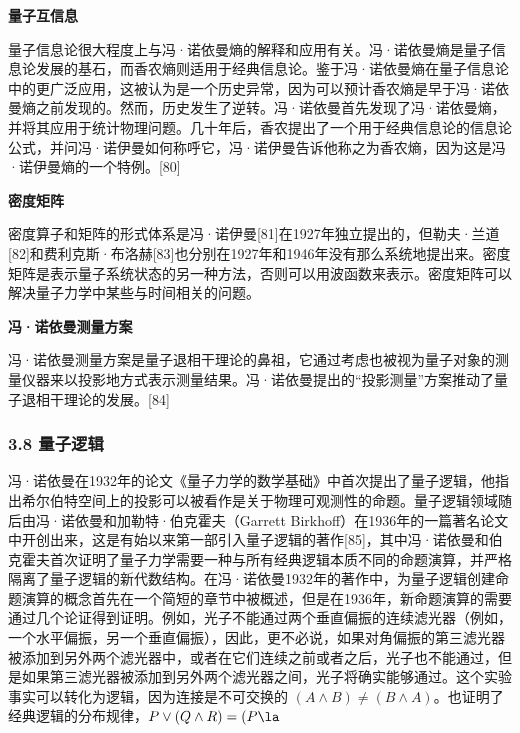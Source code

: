 \textbf{量子互信息}

量子信息论很大程度上与冯·诺依曼熵的解释和应用有关。冯·诺依曼熵是量子信息论发展的基石，而香农熵则适用于经典信息论。鉴于冯·诺依曼熵在量子信息论中的更广泛应用，这被认为是一个历史异常，因为可以预计香农熵是早于冯·诺依曼熵之前发现的。然而，历史发生了逆转。冯·诺依曼首先发现了冯·诺依曼熵，并将其应用于统计物理问题。几十年后，香农提出了一个用于经典信息论的信息论公式，并问冯·诺伊曼如何称呼它，冯·诺伊曼告诉他称之为香农熵，因为这是冯·诺伊曼熵的一个特例。[80]

\textbf{密度矩阵}

密度算子和矩阵的形式体系是冯·诺伊曼[81]在1927年独立提出的，但勒夫·兰道[82]和费利克斯·布洛赫[83]也分别在1927年和1946年没有那么系统地提出来。密度矩阵是表示量子系统状态的另一种方法，否则可以用波函数来表示。密度矩阵可以解决量子力学中某些与时间相关的问题。

\textbf{冯·诺依曼测量方案}

冯·诺依曼测量方案是量子退相干理论的鼻祖，它通过考虑也被视为量子对象的测量仪器来以投影地方式表示测量结果。冯·诺依曼提出的“投影测量”方案推动了量子退相干理论的发展。[84]
\subsubsection{3.8 量子逻辑}
冯·诺依曼在1932年的论文《量子力学的数学基础》中首次提出了量子逻辑，他指出希尔伯特空间上的投影可以被看作是关于物理可观测性的命题。量子逻辑领域随后由冯·诺依曼和加勒特·伯克霍夫（Garrett Birkhoff）在1936年的一篇著名论文中开创出来，这是有始以来第一部引入量子逻辑的著作[85]，其中冯·诺依曼和伯克霍夫首次证明了量子力学需要一种与所有经典逻辑本质不同的命题演算，并严格隔离了量子逻辑的新代数结构。在冯·诺依曼1932年的著作中，为量子逻辑创建命题演算的概念首先在一个简短的章节中被概述，但是在1936年，新命题演算的需要通过几个论证得到证明。例如，光子不能通过两个垂直偏振的连续滤光器（例如，一个水平偏振，另一个垂直偏振），因此，更不必说，如果对角偏振的第三滤光器被添加到另外两个滤光器中，或者在它们连续之前或者之后，光子也不能通过，但是如果第三滤光器被添加到另外两个滤光器之间，光子将确实能够通过。这个实验事实可以转化为逻辑，因为连接是不可交换的 $(A\land B)\ne(B\land A)$。也证明了经典逻辑的分布规律，$P\lor (Q\land R)=(P \la$